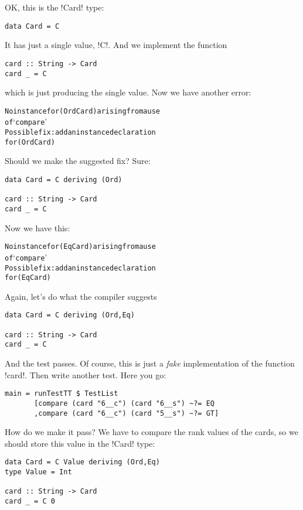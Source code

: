 \lhA \error OK, this is the \il!Card! type:
\begin{lstlisting}[frame=single]
data Card = C 
\end{lstlisting}
It has just a single value, \il!C!. And we implement the function
\begin{lstlisting}[frame=single]
card :: String -> Card
card _ = C
\end{lstlisting}
which is just producing the single value.
\lhN \error Now we have another error:
\begin{small}
\begin{alltt}
No instance for (Ord Card) arising from a use 
of `compare' 
Possible fix: add an instance declaration 
for (Ord Card)
\end{alltt}
\end{small}
Should we make the suggested fix?
\lhA \error Sure:
\begin{lstlisting}[frame=single]
data Card = C deriving (Ord)

card :: String -> Card
card _ = C
\end{lstlisting}
\lhN \error Now we have this:
\begin{small}
\begin{alltt}
No instance for (Eq Card) arising from a use 
of `compare' 
Possible fix: add an instance declaration
for (Eq Card)
\end{alltt}
\end{small}
\hspace*{\fill} 
\lhA \error Again, let's do what the compiler suggests 
\begin{lstlisting}[frame=single]
data Card = C deriving (Ord,Eq)

card :: String -> Card
card _ = C
\end{lstlisting}
\success And the test passes.
\lhN Of course, this is just a \emph{fake} implementation of the function \il!card!.
\lhA Then write another test.
\lhN Here you go:
\begin{lstlisting}[frame=single]
main = runTestTT $ TestList 
       [compare (card "6__c") (card "6__s") ~?= EQ
       ,compare (card "6__c") (card "5__s") ~?= GT]
\end{lstlisting} %
How do we make it pass?
\lhA \error We have to compare the rank values of the cards, so we should store this value in the \il!Card! type:
\begin{lstlisting}[frame=single]
data Card = C Value deriving (Ord,Eq)
type Value = Int

card :: String -> Card
card _ = C 0
\end{lstlisting}
